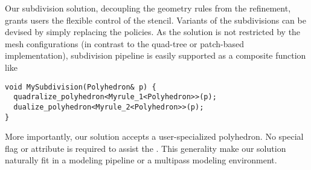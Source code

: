 Our subdivision solution, decoupling the geometry rules from the
refinement, grants users the flexible control of the stencil.
Variants of the subdivisions can be devised by simply replacing
the policies. As the solution is not restricted by the 
mesh configurations (in contrast to the quad-tree or patch-based 
implementation), subdivision pipeline is easily supported
as a composite function like
\begin{lstlisting}
void MySubdivision(Polyhedron& p) {
  quadralize_polyhedron<Myrule_1<Polyhedron>>(p);
  dualize_polyhedron<Myrule_2<Polyhedron>>(p);
} 
\end{lstlisting}

More importantly, our solution accepts a user-specialized 
polyhedron. No special flag or attribute is required 
to assist the \tr . This generality make our solution naturally fit 
in a modeling pipeline or a multipass modeling environment. 


 
